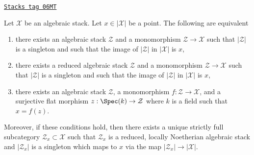 \begin{lemma}
\label{stacks-properties-lemma-residual-gerbe}
\href{https://stacks.math.columbia.edu/tag/06MT}{\texttt{Stacks tag 06MT}}

Let $\mathcal{X}$ be an algebraic stack. Let $x \in |\mathcal{X}|$ be a point.
The following are equivalent
\begin{enumerate}
\item there exists an algebraic stack $\mathcal{Z}$ and a monomorphism
$\mathcal{Z} \to \mathcal{X}$ such that $|\mathcal{Z}|$ is a singleton
and such that the image of $|\mathcal{Z}|$ in $|\mathcal{X}|$ is $x$,
\item there exists a reduced algebraic stack $\mathcal{Z}$ and a monomorphism
$\mathcal{Z} \to \mathcal{X}$ such that $|\mathcal{Z}|$ is a singleton
and such that the image of $|\mathcal{Z}|$ in $|\mathcal{X}|$ is $x$,
\item there exists an algebraic stack $\mathcal{Z}$, a monomorphism
$f : \mathcal{Z} \to \mathcal{X}$, and a surjective flat morphism
$z : \Spec(k) \to \mathcal{Z}$ where $k$ is a field such that
$x = f(z)$.
\end{enumerate}
Moreover, if these conditions hold, then there exists a unique
strictly full subcategory $\mathcal{Z}_x \subset \mathcal{X}$
such that $\mathcal{Z}_x$ is a reduced, locally Noetherian algebraic
stack and $|\mathcal{Z}_x|$ is a singleton which maps to $x$
via the map $|\mathcal{Z}_x| \to |\mathcal{X}|$.
\end{lemma}

